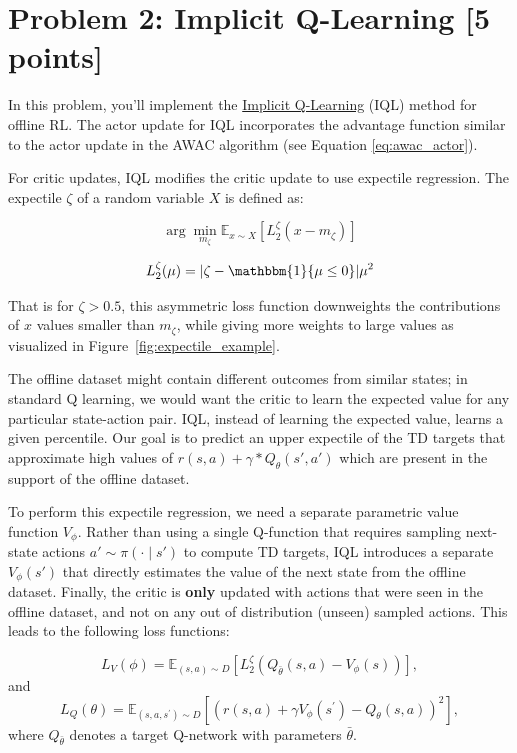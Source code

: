 \documentclass[12pt]{article}
\begin{document}
\newpage
\section*{Problem 2: Implicit Q-Learning [5 points]}
In this problem, you'll implement the \href{https://arxiv.org/abs/2110.06169}{Implicit Q-Learning} (IQL) method for offline RL. The actor update for IQL incorporates the advantage function similar to the actor update in the AWAC algorithm (see Equation \ref{eq:awac_actor}).

For critic updates, IQL modifies the critic update to use expectile regression. The expectile $\zeta$ of a random variable $X$ is defined as:

\begin{equation}
    \arg \min _{m_\zeta} \mathbb{E}_{x \sim X}\left[L_2^\zeta\left(x-m_\zeta\right)\right]
\end{equation}

\begin{equation}
 L_2^\zeta(\mu)= |\zeta - \mathbbm{1} \{\mu \leq 0\}|    \mu^2
\end{equation}

That is for $\zeta > 0.5$, this asymmetric loss function downweights the contributions of $x$ values smaller than $m_\zeta$, while giving more weights to large values as visualized in Figure~\ref{fig:expectile_example}.

The offline dataset might contain different outcomes from similar states; in standard Q learning, we would want the critic to learn the expected value for any particular state-action pair. IQL, instead of learning the expected value, learns a given percentile. Our goal is to predict an upper expectile of the TD targets that approximate high values of $r(s, a) + \gamma * Q_\theta(s', a')$ which are present in the support of the offline dataset.

To perform this expectile regression, we need a separate parametric value function $V_{\phi}$. Rather than using a single Q-function that requires sampling next-state actions $a' \sim \pi(\cdot \mid s')$ to compute TD targets, IQL introduces a separate $V_\phi(s')$ that directly estimates the value of the next state from the offline dataset. Finally, the critic is \textbf{only} updated with actions that were seen in the offline dataset, and not on any out of distribution (unseen) sampled actions. This leads to the following loss functions:

\begin{equation}
    L_V(\phi)=\mathbb{E}_{(s, a) \sim D}\left[L_2^\zeta\left(Q_{\bar{\theta}}(s, a)-V_\phi(s)\right)\right],
\end{equation}
and 
\begin{equation}
    L_Q(\theta)=\mathbb{E}_{\left(s, a, s^{\prime}\right) \sim D}\left[\left(r(s, a)+\gamma V_\phi\left(s^{\prime}\right)-Q_\theta(s, a)\right)^2\right],
\end{equation}
where $Q_{\bar{\theta}}$ denotes a target Q-network with parameters $\bar{\theta}$.
\end{document}
